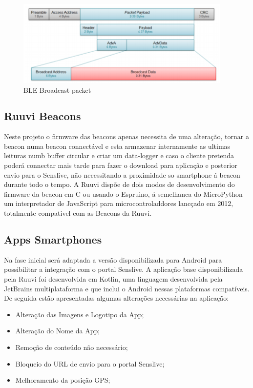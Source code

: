 \begin{figure}[ht]
  \centering
  \includegraphics[width=0.95\textwidth]{images/blepacket.png}
  \caption{BLE Broadcast packet\cite{blepacket}}\label{blepacket}
\end{figure}


\subsection{Ruuvi Beacons}
\par Neste projeto o firmware das beacons apenas necessita de uma alteração, tornar a beacon numa beacon  connectável e esta armazenar internamente as ultimas leituras numb buffer circular e criar um data-logger e caso o cliente pretenda poderá connectar mais tarde para fazer o download para aplicação e posterior envio para o Senslive, não necessitando a proximidade so smartphone á beacon durante todo o tempo. A Ruuvi dispõe de dois modos de desenvolvimento do firmware da beacon em C ou usando o Espruino, á semelhanca do MicroPython um interpretador de JavaScript para microcontroladdores lancçado em 2012, totalmente compativel com as Beacons da Ruuvi.
\subsection{Apps Smartphones}
Na fase inicial será adaptada a versão disponibilizada para Android para possibilitar a integração com o portal Senslive. A aplicação base disponibilizada pela Ruuvi foi desenvolvida em Kotlin\cite{ruuviappgithub}, uma linguagem desenvolvida pela JetBrains multiplataforma e que inclui o Android nessas plataformas compatíveis.
 De seguida estão apresentadas algumas alterações necessárias na aplicação:
\begin{itemize}
\item Alteração das Imagens e Logotipo da App;
\item Alteração do Nome da App;
\item Remoção de conteúdo não necessário;
\item Bloqueio do URL de envio para o portal Senslive;
\item Melhoramento da posição GPS;
\end{itemize}


